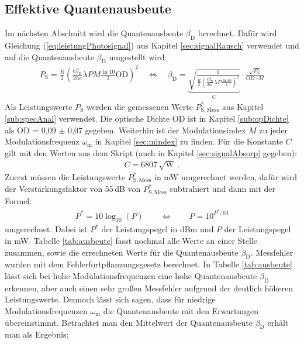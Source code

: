 \subsection{Effektive Quantenausbeute}
\label{sub:ausbeute}

Im nächsten Abschnitt wird die Quantenausbeute $\beta_\mathrm{D}$ berechnet. Dafür wird Gleichung (\ref{eq:leistungPhotosignal}) aus Kapitel \ref{sec:signalRausch} verwendet und auf die Quantenausbeute $\beta_\mathrm{D}$ umgestellt wird:
\begin{gather}
    P_\mathrm{S} = \frac{R}{2}\left(\frac{e\beta_\mathrm{D}}{2hc}\lambda P M \frac{\ln10}{2}\mathrm{OD}\right)^2
    \quad \Leftrightarrow \quad \beta_\mathrm{D} = \underbrace{\sqrt{\frac{1}{\frac{R}{2}\left(\frac{e\beta_\mathrm{D}}{2hc}\lambda P\frac{\ln10}{2}\right)^2}}}_{C} \cdot \frac{\sqrt{P_\mathrm{S}}}{\mathrm{OD}\cdot M}
\end{gather}
Als Leistungswerte $P_\mathrm{S}$ werden die gemessenen Werte $P^*_\mathrm{S,Mess}$ aus Kapitel \ref{sub:specAnal} verwendet. Die optische Dichte OD ist in Kapitel \ref{sub:opDichte} als OD = 0,09 $\pm$ 0,07 gegeben. Weiterhin ist der Modulationsindex $M$ zu jeder Modulationsfrequenz $\omega_\mathrm{m}$ in Kapitel \ref{sec:mindex} zu finden. Für die Konstante $C$ gilt mit den Werten aus dem Skript \cite{anleitung} (auch in Kapitel \ref{sec:signalAbsorp} gegeben):
\begin{gather}
    C= 6807\,\sqrt{\mathrm{W}}~.
\end{gather}
Zuerst müssen die Leistungswerte $P^*_\mathrm{S,Mess}$ in mW umgerechnet werden, dafür wird der Verstärkungsfaktor von 55\,dB von $P^*_\mathrm{S,Mess}$ subtrahiert und dann mit der Formel:
\begin{gather}
    P^* = 10\log_{10}(P) \qquad \Leftrightarrow \qquad P = 10^{P^*/10}
    \label{eq:dBmTomW}
\end{gather}
umgerechnet. \cite{anleitung} Dabei ist $P^*$ der Leistungspegel in dBm und $P$ der Leistungspegel in mW. 
Tabelle \ref{tab:ausbeute} fasst nochmal alle Werte an einer Stelle zusammen, sowie die errechneten Werte für die Quantenausbeute $\beta_\mathrm{D}$. Messfehler wurden mit dem Fehlerfortpflanzungsgesetz berechnet. In Tabelle \ref{tab:ausbeute} lässt sich bei hohe Modulationsfrequenzen eine hohe Quantenausbeute $\beta_\mathrm{D}$ erkennen, aber auch einen sehr großen Messfehler aufgrund der deutlich höheren Leistungswerte. Dennoch lässt sich sagen, dass für niedrige Modulationsfrequenzen $\omega_\mathrm{m}$ die Quantenausbeute mit den Erwartungen übereinstimmt. Betrachtet man den Mittelwert der Quantenausbeute $\beta_\mathrm{D}$ erhält man als Ergebnis:
